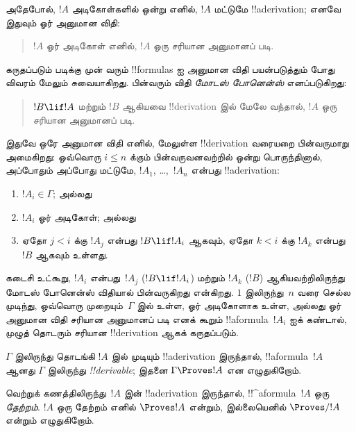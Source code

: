 \documentclass[../../../include/open-logic-section]{subfiles}
\begin{document}
அதேபோல், $!A$ அடிகோள்களில் ஒன்று எனில், $!A$ மட்டுமே
!!a{derivation}; எனவே இதுவும் ஓர் அனுமான விதி:
\begin{quote}
  $!A$ ஓர் அடிகோள் எனில், $!A$ ஒரு சரியான அனுமானப் படி.
\end{quote}

கருதப்படும் படிக்கு முன் வரும் !!{formula}s ஐ அனுமான விதி பயன்படுத்தும்
போது விவரம் மேலும் சுவையாகிறது. பின்வரும் விதி \emph{மோடஸ்
போனென்ஸ்} எனப்படுகிறது:
\begin{quote}
  $!B \lif !A$ மற்றும் $!B$ ஆகியவை !!{derivation} இல் மேலே வந்தால்,
  $!A$ ஒரு சரியான அனுமானப் படி.
\end{quote}

இதுவே ஒரே அனுமான விதி எனில், மேலுள்ள !!{derivation} வரையறை பின்வருமாறு
அமைகிறது: ஒவ்வொரு $i \le n$ க்கும் பின்வருவனவற்றில் ஒன்று பொருந்தினால்,
அப்போதும் அப்போது மட்டுமே, $!A_1$, \dots,~$!A_n$ என்பது
!!a{derivation}:
\begin{enumerate}
\item $!A_i \in \Gamma$; அல்லது
\item $!A_i$ ஓர் அடிகோள்; அல்லது
\item ஏதோ $j < i$ க்கு $!A_j$ என்பது $!B \lif !A_i$ ஆகவும், ஏதோ
  $k < i$ க்கு $!A_k$ என்பது~$!B$ ஆகவும் உள்ளது.
\end{enumerate}
கடைசி உட்கூறு, $!A_i$ என்பது~$!A_j$ ($!B \lif !A_i$) மற்றும் $!A_k$
($!B$) ஆகியவற்றிலிருந்து மோடஸ் போனென்ஸ் விதியால் பின்வருகிறது என்கிறது.
$1$ இலிருந்து~$n$ வரை செல்ல முடிந்து, ஒவ்வொரு முறையும்~$\Gamma$ இல்
உள்ள, ஓர் அடிகோளாக உள்ள, அல்லது ஓர் அனுமான விதி சரியான அனுமானப் படி எனக்
கூறும் !!a{formula}~$!A_i$ ஐக் கண்டால், முழுத் தொடரும் சரியான
!!{derivation} ஆகக் கருதப்படும்.

\begin{defn}[!!^{derivability}]
$\Gamma$ இலிருந்து தொடங்கி $!A$ இல் முடியும் !!a{derivation} இருந்தால்,
!!a{formula}~$!A$ ஆனது $\Gamma$ இலிருந்து \emph{!!{derivable}};
இதனை $\Gamma \Proves !A$ என எழுதுகிறோம்.
\end{defn}

\begin{defn}[தேற்றங்கள்]
வெற்றுக் கணத்திலிருந்து~$!A$ இன் !!a{derivation} இருந்தால்,
!!^a{formula}~$!A$ ஒரு \emph{தேற்றம்}. $!A$ ஒரு தேற்றம் எனில்
$\Proves !A$ என்றும், இல்லையெனில் $\Proves/ !A$ என்றும் எழுதுகிறோம்.
\end{defn}
\end{document}
